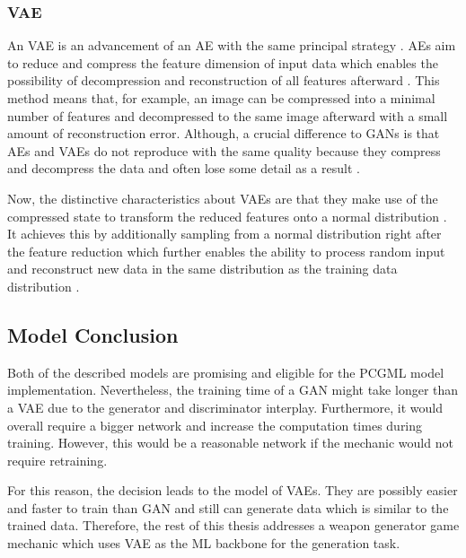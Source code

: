 \documentclass[MGS,Master,english]{twbook}%
\begin{document}
\subsubsection{\acl{VAE}}
An \ac{VAE} is an advancement of an \ac{AE} with the same principal strategy \cite{ml::vae::tutorial}. \acp{AE} aim to reduce and compress the feature dimension of input data which enables the possibility of decompression and reconstruction of all features afterward \cite{ml::book::nnProgrammingTF}. This method means that, for example, an image can be compressed into a minimal number of features and decompressed to the same image afterward with a small amount of reconstruction error. Although, a crucial difference to \acp{GAN} is that \acp{AE} and \acp{VAE} do not reproduce with the same quality because they compress and decompress the data and often lose some detail as a result \cite{ml::book::nnProgrammingTF}. 

Now, the distinctive characteristics about \acp{VAE} are that they make use of the compressed state to transform the reduced features onto a normal distribution \cite{ml::vae::tutorial}. It achieves this by additionally sampling from a normal distribution right after the feature reduction which further enables the ability to process random input and reconstruct new data in the same distribution as the training data distribution \cite{ml::vae::tutorial}.

\subsection{Model Conclusion}
Both of the described models are promising and eligible for the \ac{PCGML} model implementation. Nevertheless, the training time of a \ac{GAN} might take longer than a \ac{VAE} due to the generator and discriminator interplay. Furthermore, it would overall require a bigger network and increase the computation times during training. However, this would be a reasonable network if the mechanic would not require retraining.

For this reason, the decision leads to the model of \acp{VAE}. They are possibly easier and faster to train than \ac{GAN} and still can generate data which is similar to the trained data. Therefore, the rest of this thesis addresses a weapon generator game mechanic which uses \ac{VAE} as the \ac{ML} backbone for the generation task.
\end{document}
